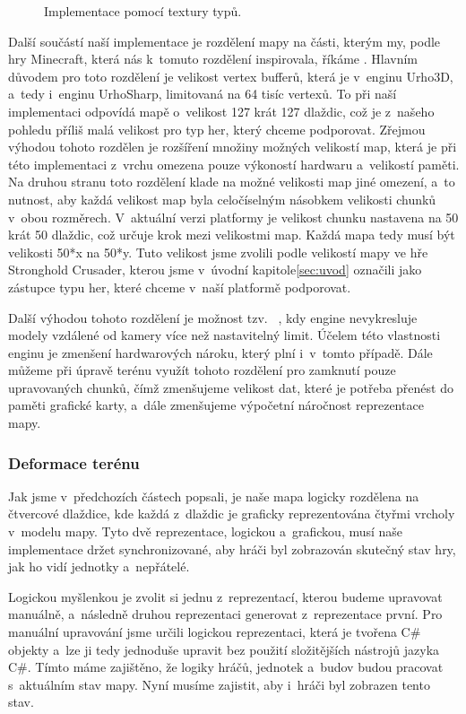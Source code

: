 \begin{figure}[h]
	\centering
	
	\caption{Implementace pomocí textury typů.}
	\label{fig:mapsmalltexture}
\end{figure}


Další součástí naší implementace je rozdělení mapy na části, kterým my, podle hry Minecraft, která nás k~tomuto rozdělení inspirovala, říkáme  . Hlavním důvodem pro toto rozdělení je velikost vertex bufferů, která je v~enginu Urho3D, a~tedy i~enginu UrhoSharp, limitovaná na 64 tisíc vertexů. To při naší implementaci odpovídá mapě o~velikost 127 krát 127 dlaždic, což je z~našeho pohledu příliš malá velikost pro typ her, který chceme podporovat. Zřejmou výhodou tohoto rozdělen je rozšíření množiny možných velikostí map, která je při této implementaci z~vrchu omezena pouze výkoností hardwaru a~velikostí paměti. Na druhou stranu toto rozdělení klade na možné velikosti map jiné omezení, a~to nutnost, aby každá velikost map byla celočíselným násobkem velikosti chunků v~obou rozměrech. V~aktuální verzi platformy je velikost chunku nastavena na 50 krát 50 dlaždic, což určuje krok mezi velikostmi map. Každá mapa tedy musí být velikosti 50*x na 50*y. Tuto velikost jsme zvolili podle velikostí mapy ve hře Stronghold Crusader, kterou jsme v~úvodní kapitole\ref{sec:uvod} označili jako zástupce typu her, které chceme v~naší platformě podporovat.

Další výhodou tohoto rozdělení je možnost tzv.~ , kdy engine nevykresluje modely vzdálené od kamery více než nastavitelný limit. Účelem této vlastnosti enginu je zmenšení hardwarových nároku, který plní i~v~tomto případě. Dále můžeme při úpravě terénu využít tohoto rozdělení pro zamknutí pouze upravovaných chunků, čímž zmenšujeme velikost dat, které je potřeba přenést do paměti grafické karty, a~dále zmenšujeme výpočetní náročnost reprezentace mapy.

\subsubsection{Deformace terénu}
Jak jsme v~předchozích částech popsali, je naše mapa logicky rozdělena na čtvercové dlaždice, kde každá z~dlaždic je graficky reprezentována čtyřmi vrcholy v~modelu mapy. Tyto dvě reprezentace, logickou a~grafickou, musí naše implementace držet synchronizované, aby hráči byl zobrazován skutečný stav hry, jak ho vidí jednotky a~nepřátelé. 

Logickou myšlenkou je zvolit si jednu z~reprezentací, kterou budeme upravovat manuálně, a~následně druhou reprezentaci generovat z~reprezentace první. Pro manuální upravování jsme určili logickou reprezentaci, která je tvořena C\# objekty a~lze ji tedy jednoduše upravit bez použití složitějších nástrojů jazyka C\#. Tímto máme zajištěno, že logiky hráčů, jednotek a~budov budou pracovat s~aktuálním stav mapy. Nyní musíme zajistit, aby i~hráči byl zobrazen tento stav.

